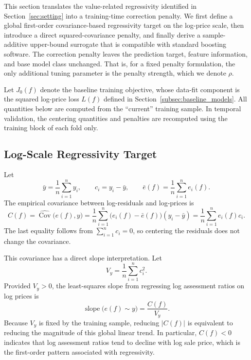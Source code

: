\documentclass[10pt]{article}
\theoremstyle{definition}
\newcommand{\1}{\mathbf{1}}
\begin{document}
{{This section translates the value-related regressivity identified in Section~\ref{sec:setting} into a training-time correction penalty. We first define a global first-order covariance-based regressivity target on the log-price scale, then introduce a direct squared-covariance penalty, and finally derive a sample-additive upper-bound surrogate that is compatible with standard boosting software. The correction penalty leaves the prediction target, feature information, and base model class unchanged. That is, for a fixed penalty formulation, the only additional tuning parameter is the penalty strength, which we denote $\rho$.}

{Let $J_0(f)$ denote the baseline training objective, whose data-fit component is the squared log-price loss $L(f)$ defined in Section~\ref{subsec:baseline_models}. All quantities below are computed from the ``current'' training sample. In temporal validation, the centering quantities and penalties are recomputed using the training block of each fold only.}


\subsection{{Log-Scale Regressivity Target}}
\label{subsec:training_regressivity}

Let
\begin{equation}
\label{eq:centered_log_price}
\bar y=\frac{1}{n}\sum_{i=1}^n y_i,
\qquad
c_i=y_i-\bar y,
\qquad
\bar e(f)=\frac{1}{n}\sum_{i=1}^n e_i(f).
\end{equation}
The empirical covariance between log-residuals and log-prices is
\begin{equation}
\label{eq:training_covariance}
C(f)
=
\widehat{\operatorname{Cov}}\bigl(e(f),y\bigr)
=
\frac{1}{n}\sum_{i=1}^n
\bigl(e_i(f)-\bar e(f)\bigr)(y_i-\bar y)
=
\frac{1}{n}\sum_{i=1}^n e_i(f)c_i.
\end{equation}
The last equality follows from $\sum_{i=1}^n c_i=0$, so centering the residuals does not change the covariance.

This covariance has a direct slope interpretation. Let
\[
V_y=\frac{1}{n}\sum_{i=1}^n c_i^2.
\]
Provided $V_y>0$, the least-squares slope from regressing log assessment ratios on log prices is
\begin{equation}
\label{eq:covariance_slope}
\operatorname{slope}\bigl(e(f)\sim y\bigr)
=
\frac{C(f)}{V_y}.
\end{equation}
Because $V_y$ is fixed by the training sample, reducing $|C(f)|$ is equivalent to reducing the magnitude of this global linear trend. In particular, $C(f)<0$ indicates that log assessment ratios tend to decline with log sale price, which is the first-order pattern associated with regressivity.

}
\end{document}
